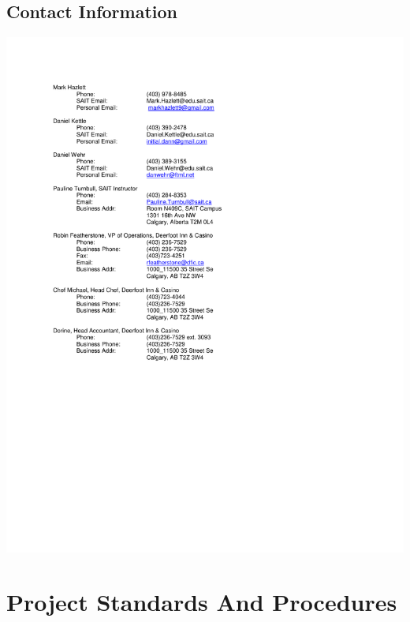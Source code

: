 \documentclass[letterpaper,12pt]{report}
\begin{document}
\section{Contact Information}

\includegraphics{externals/contact.pdf}
\pagebreak

\chapter{Project Standards And Procedures}
\end{document}
